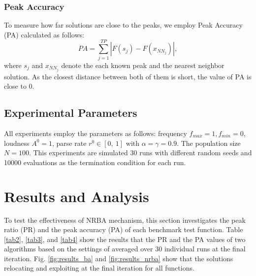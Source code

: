 \documentclass[conference]{IEEEtran}
\begin{document}
\subsubsection{Peak Accuracy}
To measure how far solutions are close to the peaks, we employ Peak Accuracy (PA) \cite{CDE} calculated as follows:
\begin{equation}
PA=\sum_{j=1}^{TP}|F(s_j)-F(x_{NN_j})|,
\end{equation}
where $s_j$ and $x_{NN_j}$ denote the each known peak and the nearest neighbor solution. As the closest distance between both of them is short, the value of PA is close to 0.  

 \subsection{Experimental Parameters}
All experiments employ the parameters as follows: frequency ${f_{max}=1, f_{min}=0}$, loudness ${A^0}=1$, parse rate ${r^0} \in [0, \ 1]$ with ${\alpha =\gamma = 0.9}$. The population size ${N=100}$. This experiments are simulated 30 runs with different random seeds and 10000 evaluations as the termination condition for each run.


\section{Results and Analysis}
To test the effectiveness of NRBA mechanism, this section investigates the peak ratio (PR) and the peak accuracy (PA) of each benchmark test function. Table \ref{tab2}, \ref{tab3}, and \ref{tab4} show the results that the PR and the PA values of two algorithms based on the settings of averaged over 30 individual runs at the final iteration. Fig. \ref{fig:results_ba} and \ref{fig:results_nrba} show that the solutions relocating and exploiting at the final iteration for all functions.
\end{document}

